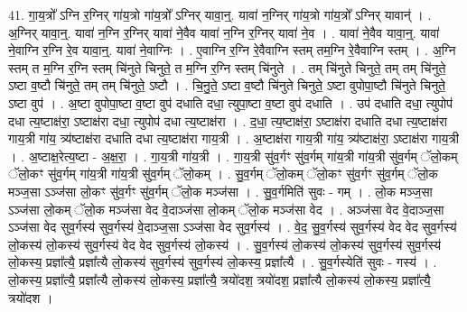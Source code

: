 \documentclass[17pt]{extarticle}
\begin{document}
41. गा॒य॒त्रो᳚ ऽग्नि र॒ग्निर् गा॑य॒त्रो गा॑य॒त्रो᳚ ऽग्निर् यावा॒न्॒. यावा॑ न॒ग्निर् गा॑य॒त्रो गा॑य॒त्रो᳚ ऽग्निर् यावान्॑ । . अ॒ग्निर् यावा॒न्॒. यावा॑ न॒ग्नि र॒ग्निर् यावा॑ ने॒वैव यावा॑ न॒ग्नि र॒ग्निर् यावा॑ ने॒व । . यावा॑ ने॒वैव यावा॒न्॒. यावा॑ ने॒वाग्नि र॒ग्नि रे॒व यावा॒न्॒. यावा॑ ने॒वाग्निः । . ए॒वाग्नि र॒ग्नि रे॒वैवाग्नि स्तम् तम॒ग्नि रे॒वैवाग्नि स्तम् । . अ॒ग्नि स्तम् त म॒ग्नि र॒ग्नि स्तम् चि॑नुते चिनुते॒ त म॒ग्नि र॒ग्नि स्तम् चि॑नुते । . तम् चि॑नुते चिनुते॒ तम् तम् चि॑नुते॒ ऽष्टा व॒ष्टौ चि॑नुते॒ तम् तम् चि॑नुते॒ ऽष्टौ । . चि॒नु॒ते॒ ऽष्टा व॒ष्टौ चि॑नुते चिनुते॒ ऽष्टा वुपोपा॒ष्टौ चि॑नुते चिनुते॒ ऽष्टा वुप॑ । . अ॒ष्टा वुपोपा॒ष्टा व॒ष्टा वुप॑ दधाति दधा॒ त्युपा॒ष्टा व॒ष्टा वुप॑ दधाति । . उप॑ दधाति दधा॒ त्युपोप॑ दधा त्य॒ष्टाक्ष॑रा॒ ऽष्टाक्ष॑रा दधा॒ त्युपोप॑ दधा त्य॒ष्टाक्ष॑रा । . द॒धा॒ त्य॒ष्टाक्ष॑रा॒ ऽष्टाक्ष॑रा दधाति दधा त्य॒ष्टाक्ष॑रा गाय॒त्री गा॑य॒ त्र्य॑ष्टाक्ष॑रा दधाति दधा त्य॒ष्टाक्ष॑रा गाय॒त्री । . अ॒ष्टाक्ष॑रा गाय॒त्री गा॑य॒ त्र्य॑ष्टाक्ष॑रा॒ ऽष्टाक्ष॑रा गाय॒त्री । . अ॒ष्टाक्ष॒रेत्य॒ष्टा - अ॒क्ष॒रा॒ । . गा॒य॒त्री गा॑य॒त्री । . गा॒य॒त्री सु॑व॒र्गꣳ सु॑व॒र्गम् गा॑य॒त्री गा॑य॒त्री सु॑व॒र्गम् ॅलो॒कम् ॅलो॒कꣳ सु॑व॒र्गम् गा॑य॒त्री गा॑य॒त्री सु॑व॒र्गम् ॅलो॒कम् । . सु॒व॒र्गम् ॅलो॒कम् ॅलो॒कꣳ सु॑व॒र्गꣳ सु॑व॒र्गम् ॅलो॒क मञ्ज॒सा ऽञ्ज॑सा लो॒कꣳ सु॑व॒र्गꣳ सु॑व॒र्गम् ॅलो॒क मञ्ज॑सा । . सु॒व॒र्गमिति॑ सुवः - गम् । . लो॒क मञ्ज॒सा ऽञ्ज॑सा लो॒कम् ॅलो॒क मञ्ज॑सा वेद वे॒दाञ्ज॑सा लो॒कम् ॅलो॒क मञ्ज॑सा वेद । . अञ्ज॑सा वेद वे॒दाञ्ज॒सा ऽञ्ज॑सा वेद सुव॒र्गस्य॑ सुव॒र्गस्य॑ वे॒दाञ्ज॒सा ऽञ्ज॑सा वेद सुव॒र्गस्य॑ । . वे॒द॒ सु॒व॒र्गस्य॑ सुव॒र्गस्य॑ वेद वेद सुव॒र्गस्य॑ लो॒कस्य॑ लो॒कस्य॑ सुव॒र्गस्य॑ वेद वेद सुव॒र्गस्य॑ लो॒कस्य॑ । . सु॒व॒र्गस्य॑ लो॒कस्य॑ लो॒कस्य॑ सुव॒र्गस्य॑ सुव॒र्गस्य॑ लो॒कस्य॒ प्रज्ञा᳚त्यै॒ प्रज्ञा᳚त्यै लो॒कस्य॑ सुव॒र्गस्य॑ सुव॒र्गस्य॑ लो॒कस्य॒ प्रज्ञा᳚त्यै । . सु॒व॒र्गस्येति॑ सुवः - गस्य॑ । . लो॒कस्य॒ प्रज्ञा᳚त्यै॒ प्रज्ञा᳚त्यै लो॒कस्य॑ लो॒कस्य॒ प्रज्ञा᳚त्यै॒ त्रयो॑दश॒ त्रयो॑दश॒ प्रज्ञा᳚त्यै लो॒कस्य॑ लो॒कस्य॒ प्रज्ञा᳚त्यै॒ त्रयो॑दश । \newline
\pagebreak
{}
\end{document}
